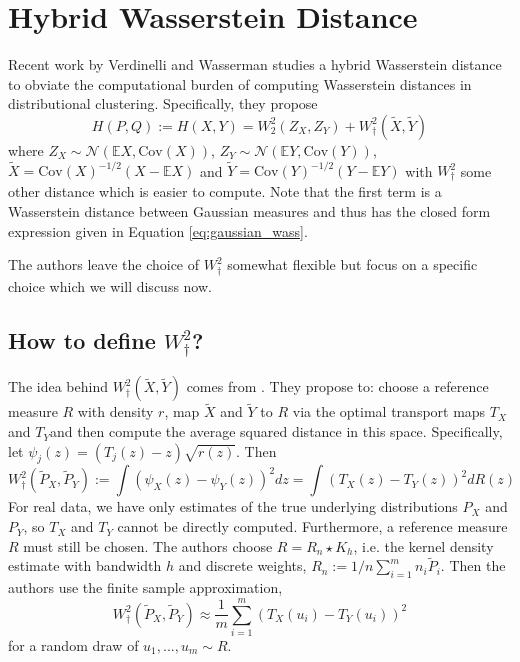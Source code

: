 \documentclass[11pt, a4paper, fleqn]{article}
\let\normalint\int %
\def\int{\displaystyle\normalint} %
\numberwithin{equation}{section}
\numberwithin{figure}{section}
\numberwithin{table}{section}
\begin{document}
\section{Hybrid Wasserstein Distance}\label{sec:hybrid_wasserstein_distance}
Recent work by Verdinelli and Wasserman \cite{verdinelli2018hybrid} studies a hybrid Wasserstein distance to obviate the computational burden of computing Wasserstein distances in distributional clustering. Specifically, they propose
\begin{equation}
H(P, Q) := H(X, Y) = W_2^2(Z_X, Z_Y) + W_{\dagger}^2(\tilde{X}, \tilde{Y})
\end{equation}
where $Z_X \sim \mathcal{N}(\mathbb{E}X, \mbox{Cov}(X))$, $Z_Y \sim\mathcal{N}(\mathbb{E}Y, \mbox{Cov}(Y))$, $\tilde{X} = \mbox{Cov}(X)^{-1/2}(X - \mathbb{E}X)$ and $\tilde{Y} = \mbox{Cov}(Y)^{-1/2}(Y - \mathbb{E}Y)$ with $W_\dagger^2$ some other distance which is easier to compute. Note that the first term is a Wasserstein distance between Gaussian measures and thus has the closed form expression given in Equation \eqref{eq:gaussian_wass}.

The authors leave the choice of $W_\dagger^2$ somewhat flexible but focus on a specific choice which we will discuss now.

\subsection{How to define $W_\dagger^2$?}
The idea behind $W_\dagger^2(\tilde{X}, \tilde{Y})$ comes from \cite{wang2013linear}. They propose to: choose a reference measure $R$ with density $r$, map $\tilde{X}$ and $\tilde{Y}$ to $R$ via the optimal transport maps $T_X$ and $T_Y$and then compute the average squared distance in this space. Specifically, let $\psi_j(z) = (T_j(z) - z)\sqrt{r(z)}$. Then 
\begin{equation}
W_\dagger^2(\tilde{P}_X, \tilde{P}_Y) := \int (\psi_X(z) - \psi_Y(z))^2 dz = \int (T_X(z) - T_Y(z))^2 dR(z)
\end{equation}
For real data, we have only estimates of the true underlying distributions $P_X$ and $P_Y$, so $T_X$ and $T_Y$ cannot be directly computed. Furthermore, a reference measure $R$ must still be chosen. The authors choose $R = R_n \star K_h$, i.e. the kernel density estimate with bandwidth $h$ and discrete weights, $R_n := 1/n \sum_{i=1}^m n_i \tilde{P}_i$. Then the authors use the finite sample approximation,
\begin{equation}
W_\dagger^2(\tilde{P}_X, \tilde{P}_Y) \approx \frac{1}{m} \sum\limits_{i=1}^m (T_X(u_i) - T_Y(u_i))^2
\end{equation}
for a random draw of $u_1, ..., u_m \sim R$.
\end{document}
